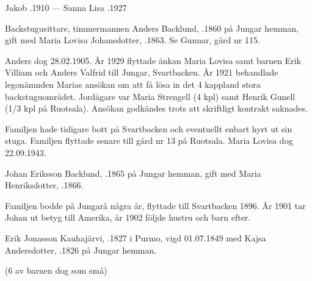 Jakob .1910  ---  Sanna Lisa .1927






Backstugusittare, timmermannen Anders Backlund, .1860 på Jungar hemman, gift med Maria Lovisa Johansdotter, .1863. Se Gunnar, gård nr 115.

Anders dog 28.02.1905. År 1929 flyttade änkan Maria Lovisa samt barnen Erik Villiam och Anders Valfrid till Jungar, Svartbacken. År 1921 behandlade legonämnden Marias ansökan om att få lösa in det 4 kappland stora backstuguområdet. Jordägare var Maria Strengell (4 kpl) samt Henrik Gunell (1/3 kpl på Ruotsala). Ansökan godkändes trots att skriftligt kontrakt saknades.

Familjen hade tidigare bott på Svartbacken och eventuellt enbart hyrt ut sin stuga. Familjen flyttade senare till gård nr 13 på Ruotsala. Maria Lovisa dog 22.09.1943.


Johan Eriksson Backlund, .1865 på Jungar hemman, gift med Maria Henriksdotter, .1866.
\begin{jhchildren}
  \item {}
  \item {}
  \item {}
  \item {}
  \item {}
  \item {}
\end{jhchildren}
Familjen bodde på Jungarå några år, flyttade till Svartbacken 1896. År 1901 tar Johan ut betyg till Amerika, år 1902 följde hustru och barn efter.


Erik Jonasson Kauhajärvi, .1827 i Purmo, vigd 01.07.1849 med Kajsa Andersdotter, .1826 på Jungar hemman.
\begin{jhchildren}
  \item {}
  \item {}
  \item {}
  \item {}
  \item {}
  \item {}
  \item {}
  \item {}
  \item {}
  \item {}
\end{jhchildren}
(6 av barnen dog som små)

